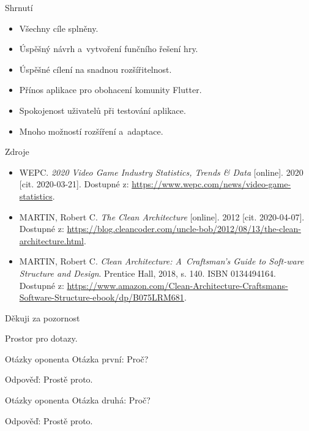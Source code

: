 \documentclass[czech,aspectratio=169]{beamer}
\begin{document}
  \begin{frame}{Shrnutí}
    \begin{itemize}
      \item Všechny cíle splněny.
      \item Úspěšný návrh a~vytvoření funčního řešení hry.
      \item Úspěšné cílení na snadnou rozšířitelnost.
      \item Přínos aplikace pro obohacení komunity Flutter.
      \item Spokojenost uživatelů při testování aplikace.
      \item Mnoho možností rozšíření a~adaptace.
    \end{itemize}
  \end{frame}

  \begin{frame}{Zdroje}
    \begin{itemize}
      \item WEPC. \emph{2020 Video Game Industry Statistics, Trends \& Data} [online]. 2020 [cit. 2020-03-21]. Dostupné z: \url{https://www.wepc.com/news/video-game-statistics}.
      \item MARTIN, Robert C. \emph{The Clean Architecture} [online]. 2012 [cit. 2020-04-07]. Dostupné z: \url{https://blog.cleancoder.com/uncle-bob/2012/08/13/the-clean-architecture.html}.
      \item MARTIN, Robert C. \emph{Clean Architecture: A~Craftsman’s Guide to Soft-ware Structure and Design}. Prentice Hall, 2018, s. 140. ISBN 0134494164. Dostupné z: \url{https://www.amazon.com/Clean-Architecture-Craftsmans-Software-Structure-ebook/dp/B075LRM681}. 
    \end{itemize}
  \end{frame}

  \begin{frame}{Děkuji za pozornost}
    \begin{center}
      Prostor pro dotazy.
    \end{center}
  \end{frame}

  \begin{frame}[noframenumbering]{Otázky oponenta}
    Otázka první: Proč?

    \vfill

    Odpověď: Prostě proto.
  \end{frame}

  \begin{frame}[noframenumbering]{Otázky oponenta}
    Otázka druhá: Proč?

    \vfill

    Odpověď: Prostě proto.
  \end{frame}
\end{document}
